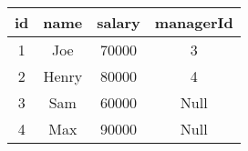 \begin{tabular}{|c|c|c|c|}
    \hline
        \textbf{id} & \textbf{name} & \textbf{salary} & \textbf{managerId} \\ \hline
        1 & Joe & 70000 & 3 \\ 
        2 & Henry & 80000 & 4 \\ 
        3 & Sam & 60000 & Null \\ 
        4 & Max & 90000 & Null \\ \hline
\end{tabular}
